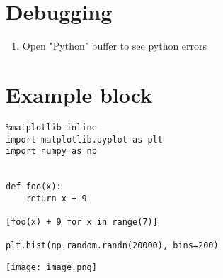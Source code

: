 \documentclass[11pt]{article}
\author{Robert Kozikowski}
\date{\today}
\title{}
\begin{document}
\tableofcontents

\section{Debugging}
\label{sec:orgheadline1}
\begin{enumerate}
\item Open "Python" buffer to see python errors
\end{enumerate}
\section{Example block}
\label{sec:orgheadline2}
\begin{verbatim}
%matplotlib inline
import matplotlib.pyplot as plt
import numpy as np


def foo(x):
    return x + 9

[foo(x) + 9 for x in range(7)]

plt.hist(np.random.randn(20000), bins=200)
\end{verbatim}

\texttt{[image: image.png]}
\end{document}
